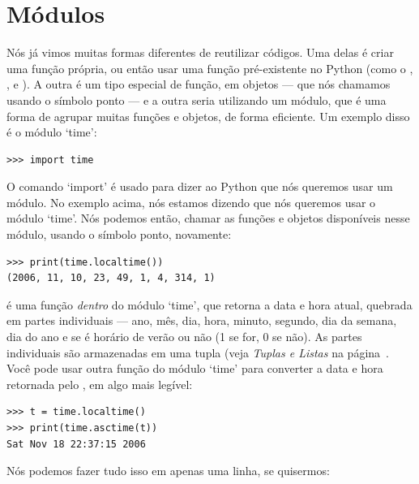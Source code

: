\section{Módulos}

Nós já vimos muitas formas diferentes de reutilizar códigos. Uma delas é criar uma função própria, ou então usar uma função pré-existente no Python (como o , ,  e ). A outra é um tipo especial de função, em objetos --- que nós chamamos usando o símbolo ponto --- e a outra seria utilizando um módulo, que é uma forma de agrupar muitas funções e objetos, de forma eficiente. Um exemplo disso é o módulo `time':

\begin{listing}
\begin{verbatim}
>>> import time
\end{verbatim}
\end{listing}

O comando `import' é usado para dizer ao Python que nós queremos usar um módulo. No exemplo acima, nós estamos dizendo que nós queremos usar o módulo `time'. Nós podemos então, chamar as funções e objetos disponíveis nesse módulo, usando o símbolo ponto, novamente:

\begin{listingignore}
\begin{verbatim}
>>> print(time.localtime())
(2006, 11, 10, 23, 49, 1, 4, 314, 1)
\end{verbatim}
\end{listingignore}

 é uma função \emph{dentro} do módulo `time', que retorna a data e hora atual, quebrada em partes individuais --- ano, mês, dia, hora, minuto, segundo, dia da semana, dia do ano e se é horário de verão ou não (1 se for, 0 se não). As partes individuais são armazenadas em uma tupla (veja \emph{Tuplas e Listas} na página~\pageref{tuplesandlists}. Você pode usar outra função do módulo `time' para converter a data e hora retornada pelo , em algo mais legível:

\begin{listingignore}
\begin{verbatim}
>>> t = time.localtime()
>>> print(time.asctime(t))
Sat Nov 18 22:37:15 2006
\end{verbatim}
\end{listingignore}

\noindent
Nós podemos fazer tudo isso em apenas uma linha, se quisermos:

